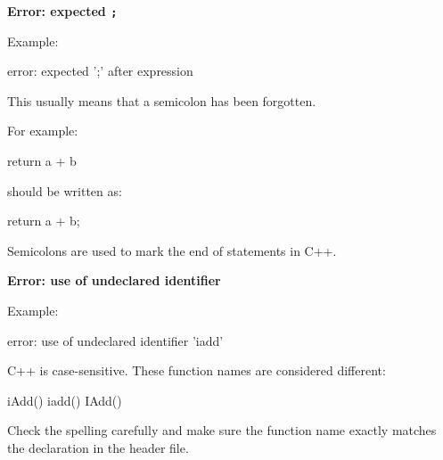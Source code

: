 \documentclass{csc2059practical}
\begin{document}
\begin{commonerror}
\textbf{Error: expected \texttt{;}}

Example:

\begin{terminal}
error: expected ';' after expression
\end{terminal}

This usually means that a semicolon has been forgotten.

For example:

\begin{cppcode}
return a + b
\end{cppcode}

should be written as:

\begin{cppcode}
return a + b;
\end{cppcode}

Semicolons are used to mark the end of statements in C++.
\end{commonerror}

\begin{commonerror}
\textbf{Error: use of undeclared identifier}

Example:

\begin{terminal}
error: use of undeclared identifier 'iadd'
\end{terminal}

C++ is case-sensitive. These function names are considered different:

\begin{cppcode}
iAdd()
iadd()
IAdd()
\end{cppcode}

Check the spelling carefully and make sure the function name exactly matches the declaration in the header file.
\end{commonerror}
\end{document}
